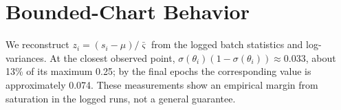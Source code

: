 \section{Bounded-Chart Behavior}
\label{app:chart_behavior}


We reconstruct $z_i=(s_i-\mu)/\bar\varsigma$ from the logged batch statistics and log-variances.
At the closest observed point, $\sigma(\theta_i)(1-\sigma(\theta_i))\approx0.033$, about 13\%
of its maximum 0.25; by the final epochs the corresponding value is approximately 0.074. These
measurements show an empirical margin from saturation in the logged runs, not a general guarantee.
